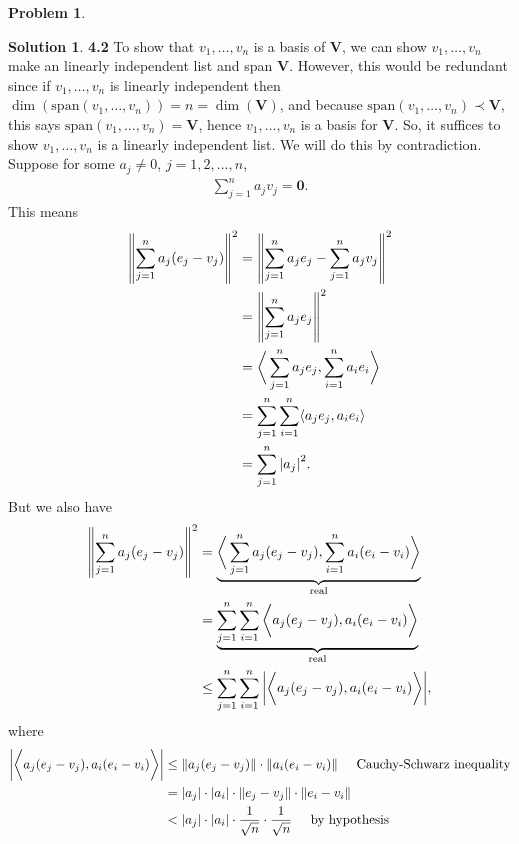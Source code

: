 \documentclass{article}
\theoremstyle{definition}
\newtheorem*{prob*}{Problem}
\newtheorem*{sln*}{Solution}
\newcommand{\V}{\mathbf{V}}
\newcommand{\xpan}{\text{span}}
\newcommand{\la}{\langle}
\newcommand{\ra}{\rangle}
\begin{document}
\begin{prob*}
\begin{enumerate}
		\begin{sln*}\textbf{4.2}
			To show that $v_1,\dots,v_n$ is a basis of $\V$, we can show $v_1,\dots,v_n$ make an linearly independent list and span $\V$. However, this would be redundant since if $v_1,\dots,v_n$ is linearly independent then $\dim(\xpan(v_1,\dots,v_n)) = n = \dim(\V)$, and because $\xpan(v_1,\dots,v_n) \prec \V$, this says $\xpan(v_1,\dots,v_n) = \V$, hence $v_1,\dots,v_n$ is a basis for $\V$. So, it suffices to show $v_1,\dots,v_n$ is a linearly independent list. We will do this by contradiction. \\
			
			Suppose for some $a_j \neq 0$, $j=1,2,\dots,n$,
			\begin{align*}
			\sum^n_{j=1}a_j v_j = \mathbf{0}.
			\end{align*}
			This means
			\begin{align*}
			\norm{\sum^n_{j=1} a_j(e_j - v_j)}^2 
			&= \norm{ \sum^n_{j=1}	a_j e_j - \sum^n_{j=1}a_jv_j }^2 \\
			&= \norm{\sum^n_{j=1}a_je_j}^2 \\
			&= \bigg\la \sum^n_{j=1}a_je_j, \sum^n_{i=1}a_ie_i \bigg\ra  \\
			&= \sum^n_{j=1}\sum^n_{i=1}\la a_j e_j , a_ie_i \ra\\
			&= \sum^n_{j=1}\abs{a_j}^2.
			\end{align*}
			But we also have
			\begin{align*}
			\norm{\sum^n_{j=1} a_j(e_j - v_j)}^2 
			&= \underbrace{\bigg\la    \sum^n_{j=1}a_j(e_j - v_j) , \sum^n_{i=1}a_i(e_i - v_i)\bigg\ra}_{\text{real}}\\
			&= \underbrace{\sum^n_{j=1}\sum^n_{i=1}\bigg\la  a_j(e_j - v_j) , a_i(e_i - v_i)\bigg\ra}_{\text{real}}\\
			&\leq \sum^n_{j=1}\sum^n_{i=1} \bigg\vert \bigg\la a_j(e_j - v_j), a_i(e_i - v_i) \bigg\ra \bigg\vert,
			\end{align*}
			where 
			\begin{align*}
			\bigg\vert \bigg\la a_j(e_j - v_j), a_i(e_i - v_i) \bigg\ra \bigg\vert 
			&\leq \norm{a_j(e_j - v_j)} \cdot \norm{a_i(e_i - v_i)} \hspace{0.5cm} \text{Cauchy-Schwarz inequality} \\
			&= \abs{a_j}\cdot \abs{a_i} \cdot \norm{e_j - v_j}\cdot \norm{e_i - v_i}\\
			&< \abs{a_j}\cdot \abs{a_i}\cdot \frac{1}{\sqrt{n}} \cdot \frac{1}{\sqrt{n}} \hspace{0.5cm}\text{by hypothesis}\\

\end{align*}
\end{sln*}
\end{enumerate}
\end{prob*}
\end{document}
